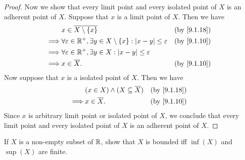 \begin{proof}
	Now we show that every limit point and every isolated point of \(X\) is an adherent point of \(X\).
	Suppose that \(x\) is a limit point of \(X\).
	Then we have
	\begin{align*}
		         & x \in \overline{X \setminus \set{x}}                                                           &  & \by{9.1.18} \\
		\implies & \forall \varepsilon \in \R^+, \exists y \in X \setminus \set{x} : \abs{x - y} \leq \varepsilon &  & \by{9.1.10} \\
		\implies & \forall \varepsilon \in \R^+, \exists y \in X : \abs{x - y} \leq \varepsilon                                    \\
		\implies & x \in \overline{X}.                                                                            &  & \by{9.1.10}
	\end{align*}
	Now suppose that \(x\) is a isolated point of \(X\).
	Then we have
	\begin{align*}
		         & (x \in X) \land (X \subseteq \overline{X}) &  & \by{9.1.18} \\
		\implies & x \in \overline{X}.                        &  & \by{9.1.10}
	\end{align*}
	Since \(x\) is arbitrary limit point or isolated point of \(X\), we conclude that every limit point and every isolated point of \(X\) is an adherent point of \(X\).
\end{proof}

\begin{ex}\label{ex:9.1.10}
	If \(X\) is a non-empty subset of \(\mathbb{R}\), show that \(X\) is bounded iff \(\inf(X)\) and \(\sup(X)\) are finite.
\end{ex}

